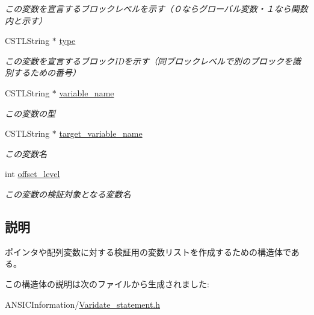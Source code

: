 \begin{DoxyCompactItemize}
\begin{DoxyCompactList}\small\item\em この変数を宣言するブロックレベルを示す（０ならグローバル変数・１なら関数内と示す） \item\end{DoxyCompactList}\item 
CSTLString $\ast$ \hyperlink{structvalidate__variable_a25c2a484b27cf32f5be46d6fda3b8853}{type}\label{structvalidate__variable_a25c2a484b27cf32f5be46d6fda3b8853}

\begin{DoxyCompactList}\small\item\em この変数を宣言するブロックIDを示す（同ブロックレベルで別のブロックを識別するための番号） \item\end{DoxyCompactList}\item 
CSTLString $\ast$ \hyperlink{structvalidate__variable_a2be1b0e38218f7cc1b23644d1a6237ff}{variable\_\-name}\label{structvalidate__variable_a2be1b0e38218f7cc1b23644d1a6237ff}

\begin{DoxyCompactList}\small\item\em この変数の型 \item\end{DoxyCompactList}\item 
CSTLString $\ast$ \hyperlink{structvalidate__variable_aa238dc06f28d558b5bb9ff8732539045}{target\_\-variable\_\-name}\label{structvalidate__variable_aa238dc06f28d558b5bb9ff8732539045}

\begin{DoxyCompactList}\small\item\em この変数名 \item\end{DoxyCompactList}\item 
int \hyperlink{structvalidate__variable_a17d23aaef8047824133aa011d7701810}{offset\_\-level}\label{structvalidate__variable_a17d23aaef8047824133aa011d7701810}

\begin{DoxyCompactList}\small\item\em この変数の検証対象となる変数名 \item\end{DoxyCompactList}\end{DoxyCompactItemize}


\subsection{説明}
ポインタや配列変数に対する検証用の変数リストを作成するための構造体である。 

この構造体の説明は次のファイルから生成されました:\begin{DoxyCompactItemize}
\item 
ANSICInformation/\hyperlink{Varidate__statement_8h}{Varidate\_\-statement.h}\end{DoxyCompactItemize}
